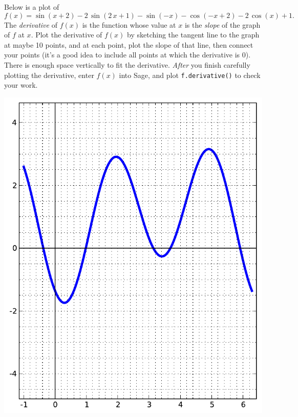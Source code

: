 Below is a plot of $$f(x)=\sin\left(x + 2\right) - 2 \, \sin\left(2 \, x + 1\right) - \sin\left(-x\right) - \cos\left(-x + 2\right) - 2 \, \cos\left(x\right) + 1.$$  The {\em \color{red}derivative} of $f(x)$ is the function whose value at $x$ is the {\em slope} of the graph of $f$ at $x$.  Plot the derivative of $f(x)$ by sketching the tangent line to the graph at maybe 10 points, and at each point, plot the slope of that line, then connect your points (it's a good idea to include all points at which the derivative is 0).  There is enough space vertically to fit the derivative.  {\em After} you finish carefully plotting the derivative, enter $f(x)$ into Sage, and plot {\color{blue}\verb|f.derivative()|} to check your work.
\begin{center}\includegraphics{functions/46.pdf}\end{center}\newpage

